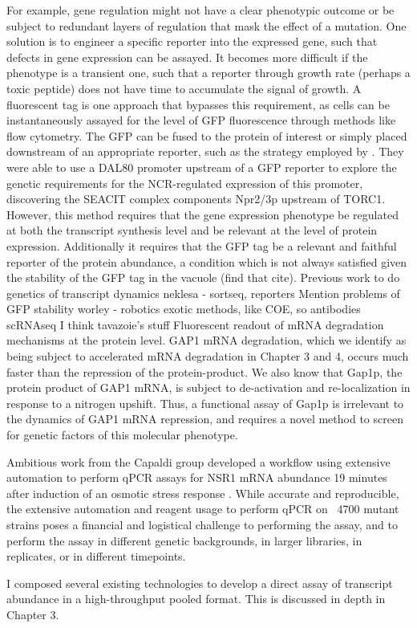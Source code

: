 For example, gene regulation might not have a
clear phenotypic outcome or be subject to redundant layers of
regulation that mask the effect of a mutation. One solution is to
engineer a specific reporter into the expressed gene, such that
defects in gene expression can be assayed. It becomes more difficult
if the phenotype is a transient one, such that a reporter through
growth rate (perhaps a toxic peptide) does not have time to accumulate
the signal of growth. A fluorescent tag is one approach that bypasses
this requirement, as cells can be instantaneously assayed for the
level of GFP fluorescence through methods like flow cytometry. The GFP
can be fused to the protein of interest or simply placed downstream of
an appropriate reporter, such as the strategy employed by 
\parencite{neklesa2009genome}. 
They were able to use a DAL80 promoter upstream of a GFP
reporter to explore the genetic requirements for the NCR-regulated
expression of this promoter, discovering the SEACIT complex components
Npr2/3p upstream of TORC1. However, this method requires that the gene
expression phenotype be regulated at both the transcript synthesis
level and be relevant at the level of protein expression. Additionally
it requires that the GFP tag be a relevant and faithful reporter of
the protein abundance, a condition which is not always satisfied given
the stability of the GFP tag in the vacuole (find that cite).
Previous work to do genetics of transcript dynamics neklesa - sortseq,
reporters Mention problems of GFP stability worley - robotics exotic
methods, like COE, so antibodies scRNAseq I think tavazoie’s stuff
Fluorescent readout of mRNA degradation mechanisms at the protein
level. GAP1 mRNA degradation, which we identify as
being subject to accelerated mRNA degradation in Chapter 3 and 4,
occurs much faster than the repression of the protein-product. We also
know that Gap1p, the protein product of GAP1 mRNA, is subject to
de-activation and re-localization in response to a nitrogen upshift.
Thus, a functional assay of Gap1p is irrelevant to the dynamics of
GAP1 mRNA repression, and requires a novel method to screen for
genetic factors of this molecular phenotype.  

Ambitious work from the
Capaldi group developed a workflow using extensive automation to
perform qPCR assays for NSR1 mRNA abundance 19 minutes after induction
of an osmotic stress response 
\parencite{worley2016genome}. While accurate and
reproducible, the extensive automation and reagent usage to perform
qPCR on ~4700 mutant strains poses a financial and logistical
challenge to performing the assay, and to perform the assay in
different genetic backgrounds, in larger libraries, in replicates, or
in different timepoints.  

I composed several existing technologies to
develop a direct assay of transcript abundance in a high-throughput
pooled format. This is discussed in depth in Chapter 3. 

